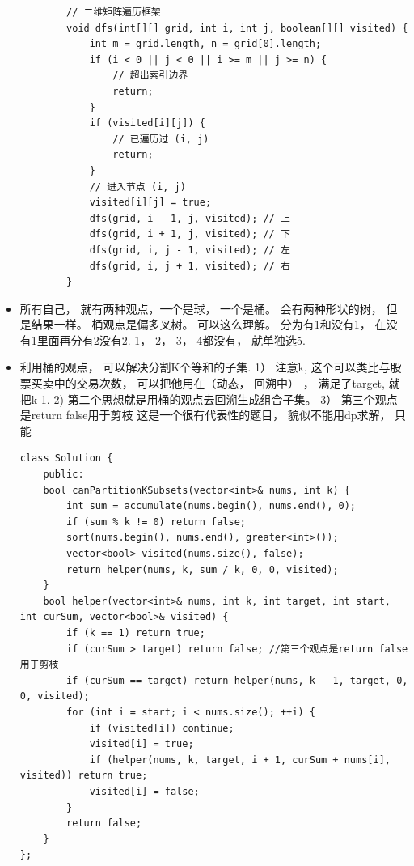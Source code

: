 \documentclass[a4paper,11pt,twoside]{book}
\begin{document}
\begin{itemize}
\begin{lstlisting}
		// 二维矩阵遍历框架
		void dfs(int[][] grid, int i, int j, boolean[][] visited) {
			int m = grid.length, n = grid[0].length;
			if (i < 0 || j < 0 || i >= m || j >= n) {
				// 超出索引边界
				return;
			}
			if (visited[i][j]) {
				// 已遍历过 (i, j)
				return;
			}
			// 进入节点 (i, j)
			visited[i][j] = true;
			dfs(grid, i - 1, j, visited); // 上
			dfs(grid, i + 1, j, visited); // 下
			dfs(grid, i, j - 1, visited); // 左
			dfs(grid, i, j + 1, visited); // 右
		}
	\end{lstlisting}

	\item 所有自己， 就有两种观点，一个是球， 一个是桶。 会有两种形状的树， 但是结果一样。  桶观点是偏多叉树。 可以这么理解。 分为有1和没有1， 在没有1里面再分有2没有2.  1， 2， 3， 4都没有， 就单独选5.  
	
	\item 利用桶的观点， 可以解决分割K个等和的子集. 1） 注意k, 这个可以类比与股票买卖中的交易次数， 可以把他用在（动态， 回溯中） ， 满足了target, 就把k-1. 2) 第二个思想就是用桶的观点去回溯生成组合子集。 3） 第三个观点是return false用于剪枝
	这是一个很有代表性的题目， 貌似不能用dp求解， 只能
\begin{lstlisting}
class Solution {
	public:
	bool canPartitionKSubsets(vector<int>& nums, int k) {
		int sum = accumulate(nums.begin(), nums.end(), 0);
		if (sum % k != 0) return false;
		sort(nums.begin(), nums.end(), greater<int>());
		vector<bool> visited(nums.size(), false);
		return helper(nums, k, sum / k, 0, 0, visited);
	}
	bool helper(vector<int>& nums, int k, int target, int start, int curSum, vector<bool>& visited) {
		if (k == 1) return true;
		if (curSum > target) return false; //第三个观点是return false用于剪枝
		if (curSum == target) return helper(nums, k - 1, target, 0, 0, visited);  
		for (int i = start; i < nums.size(); ++i) {
			if (visited[i]) continue;
			visited[i] = true;
			if (helper(nums, k, target, i + 1, curSum + nums[i], visited)) return true;
			visited[i] = false;
		}
		return false;
	}
};
\end{lstlisting}
	
	
\end{itemize}
\end{document}

